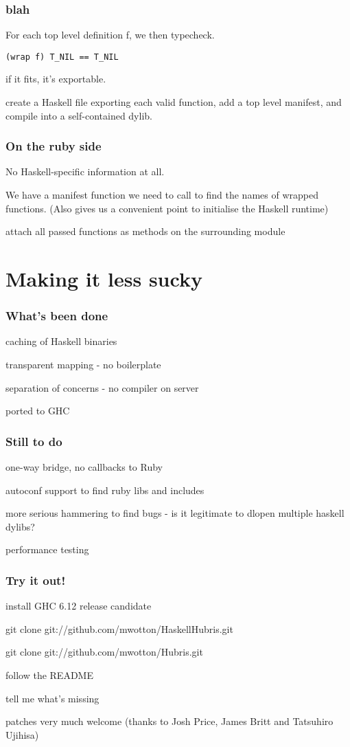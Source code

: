 \documentclass{beamer}
\begin{document}
\begin{frame}[fragile]
  \frametitle{blah}
  For each top level definition f, we then typecheck.
\begin{lstlisting}
(wrap f) T_NIL == T_NIL
\end{lstlisting}
if it fits, it's exportable.

  create a Haskell file exporting each valid function, add a top level
  manifest, and compile into a self-contained dylib.

\end{frame}

\begin{frame}
 \frametitle{On the ruby side}
 No Haskell-specific information at all.

 We have a manifest function we need to call to find the names of
 wrapped functions. (Also gives us a convenient point to initialise
 the Haskell runtime)

 attach all passed functions as methods on the surrounding module

\end{frame}


\section{Making it less sucky}
\begin{frame}
\setlength\parskip{0.1in}
\frametitle{What's been done}
  caching of Haskell binaries

  transparent mapping - no boilerplate

  separation of concerns - no compiler on server

  ported to GHC
\end{frame}

\begin{frame}
\frametitle{Still to do}
  one-way bridge, no callbacks to Ruby

  autoconf support to find ruby libs and includes

  more serious hammering to find bugs - is it legitimate to dlopen
  multiple haskell dylibs?

  performance testing

\end{frame}


\begin{frame}
\frametitle{Try it out!}
  install GHC 6.12 release candidate

  git clone git://github.com/mwotton/HaskellHubris.git

  git clone git://github.com/mwotton/Hubris.git

  follow the README

  tell me what's missing

  patches very much welcome (thanks to Josh Price, James Britt and Tatsuhiro Ujihisa)
\end{frame}
\end{document}
